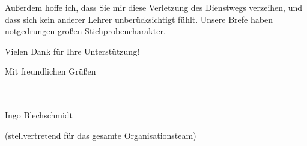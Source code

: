 \documentclass{zirkelbrief}
\begin{document}
Außerdem hoffe ich, dass Sie mir diese Verletzung des Dienstwegs verzeihen, und
dass sich kein anderer Lehrer unberücksichtigt fühlt. Unsere Brefe haben
notgedrungen großen Stichprobencharakter.

Vielen Dank für Ihre Unterstützung!

Mit freundlichen Grüßen

\ \\
\ \\

Ingo Blechschmidt

\vspace{-0.2cm}

{\small (stellvertretend für das gesamte Organisationsteam)}
\end{document}
